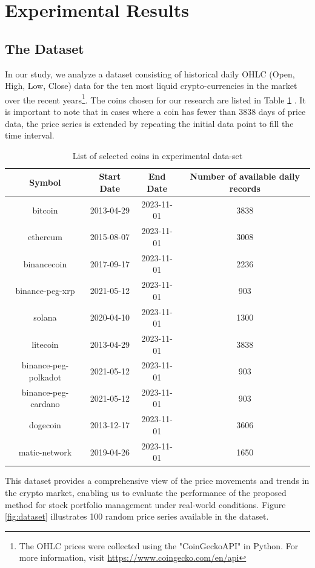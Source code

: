 \section{Experimental Results}

\subsection{The Dataset}

In our study, we analyze a dataset consisting of historical daily OHLC (Open, High, Low, Close) data for the ten most liquid crypto-currencies in the market over the recent years\footnote{The OHLC prices were collected using the "CoinGeckoAPI" in Python. For more information, visit \url{https://www.coingecko.com/en/api}}. The coins chosen for our research are listed in Table \ref{tbl:data} . It is important to note that in cases where a coin has fewer than 3838 days of price data, the price series is extended by repeating the initial data point to fill the time interval.

\begin{table}[h]
	\centering
	\caption{List of selected coins in experimental data-set}
	\begin{tabular}{c|c|c|c}
		Symbol & Start Date & End Date & Number of available daily records \\
		\hline
		\hline
		bitcoin & 2013-04-29 & 2023-11-01& 3838 \\
		ethereum & 2015-08-07 & 2023-11-01& 3008 \\
		binancecoin & 2017-09-17 & 2023-11-01& 2236 \\
		binance-peg-xrp & 2021-05-12 & 2023-11-01& 903 \\
		solana & 2020-04-10 & 2023-11-01& 1300 \\
		litecoin & 2013-04-29 & 2023-11-01& 3838 \\
		binance-peg-polkadot & 2021-05-12 & 2023-11-01& 903 \\
		binance-peg-cardano & 2021-05-12 & 2023-11-01& 903 \\
		dogecoin & 2013-12-17  & 2023-11-01& 3606 \\
		matic-network & 2019-04-26 & 2023-11-01& 1650\\
		
	\end{tabular}
	\label{tbl:data}

\end{table}

This dataset provides a comprehensive view of the price movements and trends in the crypto market, enabling us to evaluate the performance of the proposed method for stock portfolio management under real-world conditions. Figure \ref{fig:dataset} illustrates 100 random price series available in the dataset.

